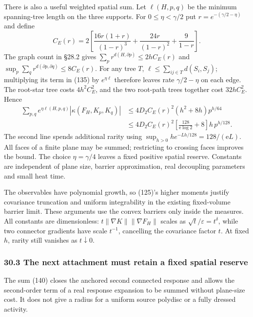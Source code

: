 \documentclass[11pt,a4paper]{article}
\begin{document}
There is also a useful weighted spatial sum. Let \(\ell(H,p,q)\) be the
minimum spanning-tree length on the three supports. For
\(0\le\eta<\gamma/2\) put \(r=e^{-(\gamma/2-\eta)}\) and define
\[C_E(r)=2\left[
 \frac{16r(1+r)}{(1-r)^3}+\frac{24r}{(1-r)^2}+
 \frac9{1-r}\right].\] The graph count in §28.2 gives
\(\sum_p r^{d(H,\partial p)}\le2hC_E(r)\) and
\(\sup_p\sum_q r^{d(\partial p,\partial q)}\le8C_E(r)\). For any tree
\(T\), \(\ell\le\sum_{ij\in T}d(S_i,S_j)\); multiplying its term in
(135) by \(e^{\eta\ell}\) therefore leaves rate \(\gamma/2-\eta\) on
each edge. The root-star tree costs \(4h^2C_E^2\), and the two root-path
trees together cost \(32hC_E^2\). Hence \[\begin{aligned}
\sum_{p,q}e^{\eta\ell(H,p,q)}
 |\kappa(F_H,K_p,K_q)|
&\le4D_2C_E(r)^2(h^2+8h)p^{h/64}\\
&\le4D_2C_E(r)^2
 \left[\frac{128}{\mathrm e\log2}+8\right]h\,p^{h/128}.
\end{aligned}\tag{140}\] The second line spends additional rarity using
\(\sup_{h>0}h e^{-Lh/128}=128/(\mathrm eL)\). All faces of a finite
plane may be summed; restricting to crossing faces improves the bound.
The choice \(\eta=\gamma/4\) leaves a fixed positive spatial reserve.
Constants are independent of plane size, barrier approximation, real
decoupling parameters and small heat time.

The observables have polynomial growth, so (125)'s higher moments
justify covariance truncation and uniform integrability in the existing
fixed-volume barrier limit. These arguments use the convex barriers only
inside the measures. All constants are dimensionless:
\(t\|\nabla K\|\|\nabla F_H\|\) scales as
\(\sqrt t/\varepsilon=t^\delta\), while two connector gradients have
scale \(t^{-1}\), cancelling the covariance factor \(t\). At fixed
\(h\), rarity still vanishes as \(t\downarrow0\).

\hypertarget{the-next-attachment-must-retain-a-fixed-spatial-reserve}{%
\subsubsection{30.3 The next attachment must retain a fixed spatial
reserve}\label{the-next-attachment-must-retain-a-fixed-spatial-reserve}}

The sum (140) closes the anchored second connected response and allows
the second-order term of a real response expansion to be summed without
plane-size cost. It does not give a radius for a uniform source polydisc
or a fully dressed activity.
\end{document}
